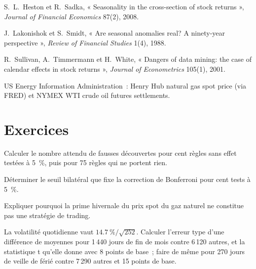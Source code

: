 \begin{omsources}
\item S.~L.~Heston et R.~Sadka, « Seasonality in the cross-section of stock returns », \emph{Journal of Financial Economics} 87(2), 2008.
\item J.~Lakonishok et S.~Smidt, « Are seasonal anomalies real? A ninety-year perspective », \emph{Review of Financial Studies} 1(4), 1988.
\item R.~Sullivan, A.~Timmermann et H.~White, « Dangers of data mining: the case of calendar effects in stock returns », \emph{Journal of Econometrics}
105(1), 2001.
\item US Energy Information Administration~: Henry Hub natural gas spot price (via FRED) et NYMEX WTI crude oil futures settlements.
\end{omsources}

\section{Exercices}

\begin{exercise}[$\star$]\label{exo:s1:seasonality-and-calendar-effects:1}
Calculer le nombre attendu de fausses découvertes pour cent règles sans effet testées à 5~\%, puis pour 75 règles qui ne portent rien.
\end{exercise}

\begin{exercise}[$\star$]\label{exo:s1:seasonality-and-calendar-effects:2}
Déterminer le seuil bilatéral que fixe la correction de Bonferroni pour cent tests à 5~\%.
\end{exercise}

\begin{exercise}[$\star$]\label{exo:s1:seasonality-and-calendar-effects:3}
Expliquer pourquoi la prime hivernale du prix spot du gaz naturel ne constitue pas une stratégie de trading.
\end{exercise}

\begin{exercise}[$\star\star$]\label{exo:s1:seasonality-and-calendar-effects:4}
La volatilité quotidienne vaut $14.7~\%/\sqrt{252}$. Calculer l'erreur type d'une différence de moyennes pour 1\,440 jours de fin de mois contre 6\,120 autres, et la
statistique t qu'elle donne avec 8 points de base~; faire de même pour 270 jours de veille de férié contre 7\,290 autres et 15 points de base.
\end{exercise}

